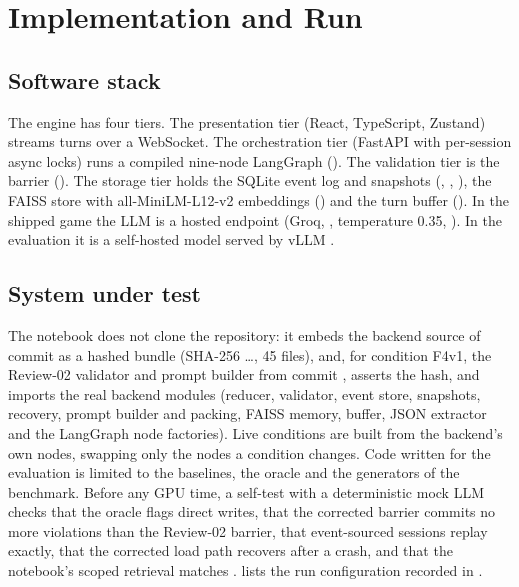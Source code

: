 \documentclass[letterpaper,journal,onecolumn]{IEEEtran}
\begin{document}
\section{Implementation and Run}\label{sec:impl-ext}

\subsection{Software stack}
The engine has four tiers. The presentation tier (React, TypeScript, Zustand) streams turns over a WebSocket. The orchestration tier (FastAPI with per-session async locks) runs a compiled nine-node LangGraph  (). The validation tier is the barrier (). The storage tier holds the SQLite event log and snapshots (, , ), the FAISS store with all-MiniLM-L12-v2 embeddings () and the turn buffer (). In the shipped game the LLM is a hosted endpoint (Groq, , temperature 0.35, ). In the evaluation it is a self-hosted model served by vLLM \cite{kwon2023vllm}.

\subsection{System under test}\label{sec:repro}
The notebook  does not clone the repository: it embeds the backend source of commit  as a hashed bundle (SHA-256 \ldots, 45 files), and, for condition F4v1, the Review-02 validator and prompt builder from commit , asserts the hash, and imports the real backend modules (reducer, validator, event store, snapshots, recovery, prompt builder and packing, FAISS memory, buffer, JSON extractor and the LangGraph node factories). Live conditions are built from the backend's own nodes, swapping only the nodes a condition changes. Code written for the evaluation is limited to the baselines, the oracle and the generators of the benchmark. Before any GPU time, a self-test with a deterministic mock LLM checks that the oracle flags direct writes, that the corrected barrier commits no more violations than the Review-02 barrier, that event-sourced sessions replay exactly, that the corrected load path recovers after a crash, and that the notebook's scoped retrieval matches .  lists the run configuration recorded in .
\end{document}
